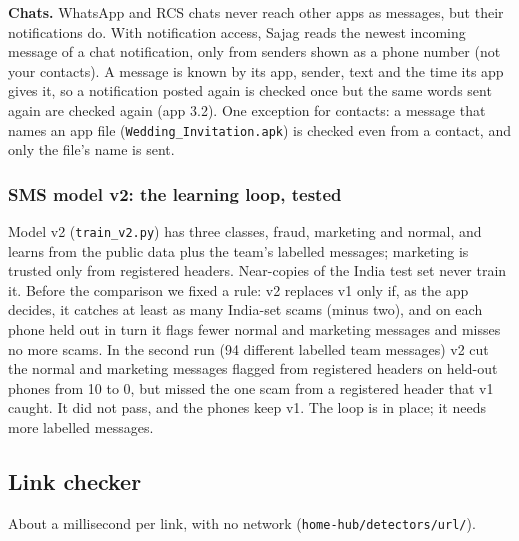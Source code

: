 \documentclass[11pt,a4paper]{article}
\newcommand{\code}[1]{\texttt{#1}}
\begin{document}
\textbf{Chats.} WhatsApp and RCS chats never reach other apps as messages, but their notifications do. With
notification access, Sajag reads the newest incoming message of a chat notification, only from senders shown as a
phone number (not your contacts). A message is known by its app, sender, text and the time its app gives it, so a
notification posted again is checked once but the same words sent again are checked again (app 3.2). One
exception for contacts: a message that names an app file (\code{Wedding\_Invitation.apk}) is checked even from a
contact, and only the file's name is sent.

\subsubsection*{SMS model v2: the learning loop, tested}
\label{sec:smsv2}

Model v2 (\code{train\_v2.py}) has three classes, fraud, marketing and normal, and learns from the public data plus
the team's labelled messages; marketing is trusted only from registered headers. Near-copies of the India test set
never train it. Before the comparison we fixed a rule: v2 replaces v1 only if, as the app decides, it catches at
least as many India-set scams (minus two), and on each phone held out in turn it flags fewer normal and marketing
messages and misses no more scams. In the second run (94 different labelled team messages) v2 cut the normal and
marketing messages flagged from registered headers on held-out phones from 10 to 0, but missed the one scam from a
registered header that v1 caught. It did not pass, and the phones keep v1. The loop is in place; it needs more
labelled messages.

\subsection{Link checker}
\label{sec:links}

About a millisecond per link, with no network (\code{home-hub/detectors/url/}).
\end{document}
